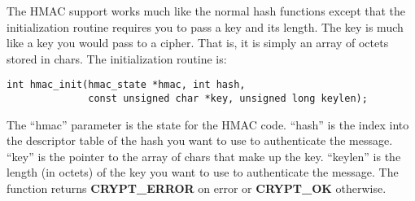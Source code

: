 \documentclass{book}
\begin{document}
The HMAC support works much like the normal hash functions except that the initialization routine requires you to pass a key 
and its length.  The key is much like a key you would pass to a cipher.  That is, it is simply an array of octets stored in
chars.  The initialization routine is:
\begin{verbatim}
int hmac_init(hmac_state *hmac, int hash, 
              const unsigned char *key, unsigned long keylen);
\end{verbatim}
The ``hmac'' parameter is the state for the HMAC code.  ``hash'' is the index into the descriptor table of the hash you want
to use to authenticate the message.  ``key'' is the pointer to the array of chars that make up the key.  ``keylen'' is the
length (in octets) of the key you want to use to authenticate the message.  The function returns {\bf CRYPT\_ERROR} on error
or {\bf CRYPT\_OK} otherwise.
\end{document}
